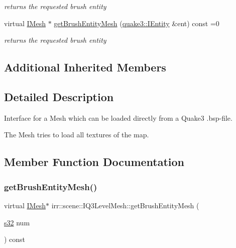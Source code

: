 \begin{DoxyCompactItemize}
\begin{DoxyCompactList}\small\item\em returns the requested brush entity \end{DoxyCompactList}\item 
\mbox{\label{classirr_1_1scene_1_1IQ3LevelMesh_a31276c90be36a1c7c5b8e87433dd5f63}} 
virtual \hyperlink{classirr_1_1scene_1_1IMesh}{I\+Mesh} $\ast$ \hyperlink{classirr_1_1scene_1_1IQ3LevelMesh_a31276c90be36a1c7c5b8e87433dd5f63}{get\+Brush\+Entity\+Mesh} (\hyperlink{structirr_1_1scene_1_1quake3_1_1IShader}{quake3\+::\+I\+Entity} \&ent) const =0
\begin{DoxyCompactList}\small\item\em returns the requested brush entity \end{DoxyCompactList}\end{DoxyCompactItemize}
\subsection*{Additional Inherited Members}


\subsection{Detailed Description}
Interface for a Mesh which can be loaded directly from a Quake3 .bsp-\/file. 

The Mesh tries to load all textures of the map. 

\subsection{Member Function Documentation}
\mbox{\label{classirr_1_1scene_1_1IQ3LevelMesh_ad0ed15c97e55ffb02d1d48fb62a769d5}} 
\subsubsection{\texorpdfstring{get\+Brush\+Entity\+Mesh()}{getBrushEntityMesh()}\hspace{0.1cm}{\footnotesize\ttfamily [1/2]}}
{\footnotesize\ttfamily virtual \hyperlink{classirr_1_1scene_1_1IMesh}{I\+Mesh}$\ast$ irr\+::scene\+::\+I\+Q3\+Level\+Mesh\+::get\+Brush\+Entity\+Mesh (\begin{DoxyParamCaption}\item[{\hyperlink{namespaceirr_ac66849b7a6ed16e30ebede579f9b47c6}{s32}}]{num }\end{DoxyParamCaption}) const\hspace{0.3cm}{\ttfamily [pure virtual]}}



